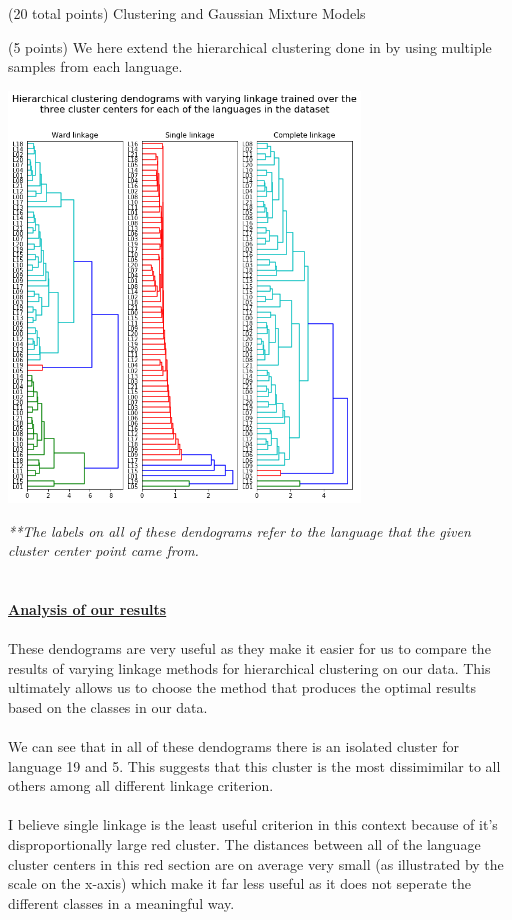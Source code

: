 \documentclass[12pt]{article}
\begin{document}
\begin{question}{(20 total points) Clustering and Gaussian Mixture Models}
\begin{subquestion}{(5 points)
       We here extend the hierarchical clustering done in  by
       using multiple samples from each language.
     }
      \begin{answerbox}{50em}
        \begin{center}
        \includegraphics[width=0.7\textwidth]{images/q34.png}
        \end{center}
        \scriptsize{
        \emph{**The labels on all of these dendograms refer to the language that the given cluster center point came from.}\\
\\
\\
        \textbf{\footnotesize{\underline{Analysis of our results}}}\\
\\
        These dendograms are very useful as they make it easier for us to compare the results of varying linkage methods for hierarchical clustering on our data. This ultimately allows us to choose the method that produces the optimal results based on the classes in our data.\\
\\
        We can see that in all of these dendograms there is an isolated cluster for language 19 and 5. This suggests that this cluster is the most dissimimilar to all others among all different linkage criterion.\\
\\
        I believe single linkage is the least useful criterion in this context because of it's disproportionally large red cluster. The distances between all of the language cluster centers in this red section are on average very small (as illustrated by the scale on the x-axis) which make it far less useful as it does not seperate the different classes in a meaningful way.\\
}
\end{answerbox}
\end{subquestion}
\end{question}
\end{document}
